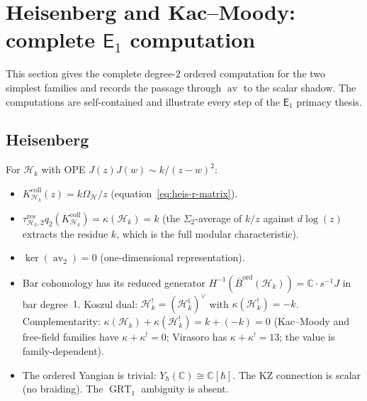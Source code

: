 \documentclass[11pt,reqno]{amsart}
\theoremstyle{definition}
\theoremstyle{remark}
\newcommand{\cH}{\mathcal{H}}
\newcommand{\Eone}{\mathsf{E}_{1}}
\DeclareMathOperator{\av}{av}
\DeclareMathOperator{\GRT}{GRT}
\newcommand{\Barord}{\overline{B}^{\mathrm{ord}}}
\newcommand{\CC}{\mathbb{C}}
\numberwithin{equation}{section}
\begin{document}
\section{Heisenberg and Kac--Moody: complete $\Eone$ computation}
\label{sec:heis-km}

This section gives the complete degree-$2$ ordered computation
for the two simplest families and records the passage through $\av$
to the scalar shadow. The computations are self-contained and
illustrate every step of the $\Eone$ primacy thesis.

\subsection{Heisenberg}

For $\cH_k$ with OPE $J(z)J(w) \sim k/(z-w)^2$:
\begin{itemize}
\item $K_{\cH_k}^{\mathrm{coll}}(z)=k\Omega_{\mathcal H}/z$
  (equation~\eqref{eq:heis-r-matrix}).
\item $\tau_{\cH_k,2}^{\mathrm{res}}q_2(K_{\cH_k}^{\mathrm{coll}})
  =\kappa(\cH_k)=k$
  (the $\Sigma_2$-average of $k/z$ against $d\log(z)$ extracts
  the residue $k$, which is the full modular characteristic).
\item $\ker(\av_2) = 0$ (one-dimensional representation).
\item Bar cohomology has its reduced generator
  $H^{-1}(\Barord(\cH_k)) = \CC \cdot s^{-1}J$ in bar degree~$1$.
  Koszul dual:
  $\cH_k^! = (\cH_k^{\mathrm{i}})^\vee$ with
  $\kappa(\cH_k^!) = -k$. Complementarity:
  $\kappa(\cH_k) + \kappa(\cH_k^!) = k + (-k) = 0$
  (Kac--Moody and free-field families have $\kappa + \kappa^! = 0$;
  Virasoro has $\kappa + \kappa^! = 13$; the value is
  family-dependent).
\item The ordered Yangian is trivial: $Y_\hbar(\CC) \cong \CC[\hbar]$.
  The KZ connection is scalar (no braiding). The $\GRT_1$ ambiguity
  is absent.
\end{itemize}
\end{document}
